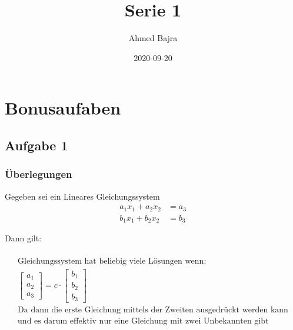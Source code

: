 \documentclass{article}
\title{Serie 1}
\author{Ahmed Bajra}
\date{2020-09-20}
\begin{document}
    \maketitle

    \section{Bonusaufaben}
    \subsection{Aufgabe 1}
    \subsubsection{Überlegungen}

    Gegeben sei ein Lineares Gleichungssystem
    \begin{align*}
        a_1 x_1 + a_2 x_2& = a_3 \\
        b_1 x_1 + b_2 x_2& = b_3
    \end{align*}

    Dann gilt: 

    \begin{equation}
        \begin{gathered}
            \\
            \text{Gleichungssystem hat beliebig viele Lösungen wenn: } \\
            \begin{bmatrix}
                a_1 \\
                a_2 \\
                a_3
            \end{bmatrix}
            = c \cdot
            \begin{bmatrix}
                b_1 \\
                b_2 \\
                b_3
            \end{bmatrix} \\
            \text{Da dann die erste Gleichung mittels der Zweiten ausgedrückt werden kann}\\
            \text{und es darum effektiv nur eine Gleichung mit zwei Unbekannten gibt}
            \\
        \end{gathered}
    \end{equation}
\end{document}
